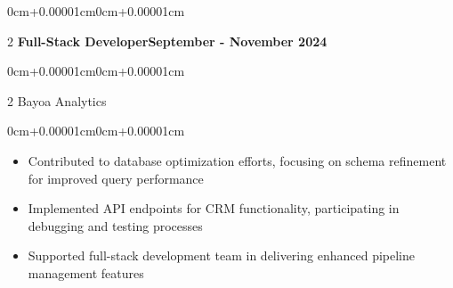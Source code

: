 \documentclass[11pt, letterpaper]{article}
\newenvironment{highlights}{\begin{itemize}[topsep=0.10cm,parsep=0.10cm,partopsep=0pt,itemsep=0pt,leftmargin=0cm+12pt]}{\end{itemize}}
\newenvironment{onecolentry}{\begin{adjustwidth}{0cm+0.00001cm}{0cm+0.00001cm}}{\end{adjustwidth}}
\newenvironment{twocolentry}[2][]{\onecolentry\def\secondColumn{#2}\setcolumnwidth{\fill,5.5cm}\begin{paracol}{2}}{\switchcolumn \raggedleft \secondColumn\end{paracol}\endonecolentry}
\begin{document}
    \begin{twocolentry}{\textbf{September - November 2024}}
    \textbf{Full-Stack Developer}\end{twocolentry}
    \vspace{0.05cm}
    \begin{twocolentry}{}
    Bayoa Analytics\end{twocolentry}
    \vspace{0.10cm}
    \begin{onecolentry}
        \begin{highlights}
            \item Contributed to database optimization efforts, focusing on schema refinement for improved query performance
            \item Implemented API endpoints for CRM functionality, participating in debugging and testing processes
            \item Supported full-stack development team in delivering enhanced pipeline management features
        \end{highlights}
    \end{onecolentry}
    \vspace{0.15cm}
\end{document}
